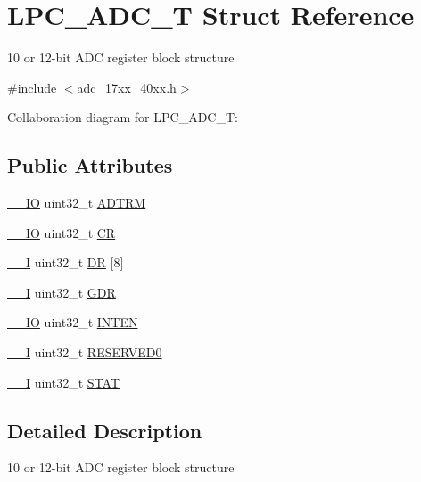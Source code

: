 \hypertarget{structLPC__ADC__T}{}\section{L\+P\+C\+\_\+\+A\+D\+C\+\_\+T Struct Reference}
\label{structLPC__ADC__T}


10 or 12-\/bit A\+DC register block structure  




{\ttfamily \#include $<$adc\+\_\+17xx\+\_\+40xx.\+h$>$}



Collaboration diagram for L\+P\+C\+\_\+\+A\+D\+C\+\_\+T\+:
\subsection*{Public Attributes}
\begin{DoxyCompactItemize}
\item 
\hyperlink{core__cm3_8h_aec43007d9998a0a0e01faede4133d6be}{\+\_\+\+\_\+\+IO} uint32\+\_\+t \hyperlink{structLPC__ADC__T_a22f04dd0b40c5a05707c0b1e43bd10bd}{A\+D\+T\+RM}
\item 
\hyperlink{core__cm3_8h_aec43007d9998a0a0e01faede4133d6be}{\+\_\+\+\_\+\+IO} uint32\+\_\+t \hyperlink{structLPC__ADC__T_a751f1cbdd3d5242aea596dc18113fedc}{CR}
\item 
\hyperlink{core__cm3_8h_af63697ed9952cc71e1225efe205f6cd3}{\+\_\+\+\_\+I} uint32\+\_\+t \hyperlink{structLPC__ADC__T_a10f521f172d10766bb189be671f8bd57}{DR} \mbox{[}8\mbox{]}
\item 
\hyperlink{core__cm3_8h_af63697ed9952cc71e1225efe205f6cd3}{\+\_\+\+\_\+I} uint32\+\_\+t \hyperlink{structLPC__ADC__T_a063e42ec8fcdcf5590579a8d1a888ca0}{G\+DR}
\item 
\hyperlink{core__cm3_8h_aec43007d9998a0a0e01faede4133d6be}{\+\_\+\+\_\+\+IO} uint32\+\_\+t \hyperlink{structLPC__ADC__T_a3ed883c378f817342d10cb7ed29a05ae}{I\+N\+T\+EN}
\item 
\hyperlink{core__cm3_8h_af63697ed9952cc71e1225efe205f6cd3}{\+\_\+\+\_\+I} uint32\+\_\+t \hyperlink{structLPC__ADC__T_afeba3e59f72b009dfb03377557ddcd60}{R\+E\+S\+E\+R\+V\+E\+D0}
\item 
\hyperlink{core__cm3_8h_af63697ed9952cc71e1225efe205f6cd3}{\+\_\+\+\_\+I} uint32\+\_\+t \hyperlink{structLPC__ADC__T_a6fd64c9a5717b2adc106721eb9ab190b}{S\+T\+AT}
\end{DoxyCompactItemize}


\subsection{Detailed Description}
10 or 12-\/bit A\+DC register block structure 

